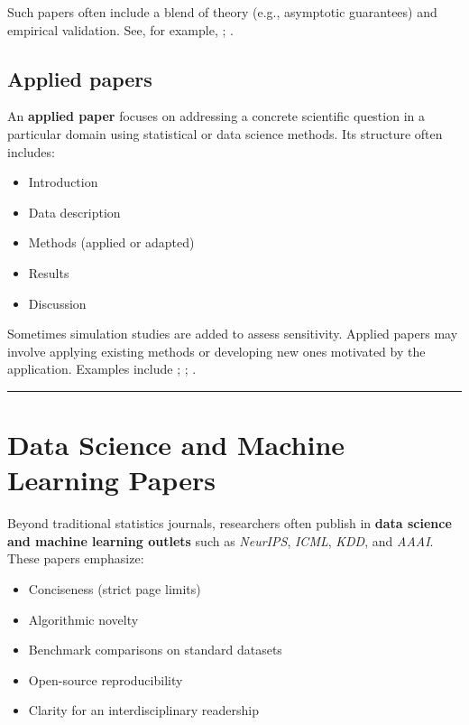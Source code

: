 \documentclass[
]{book}
\providecommand{\tightlist}{%
  \setlength{\itemsep}{0pt}\setlength{\parskip}{0pt}}
\theoremstyle{definition}
\theoremstyle{definition}
\theoremstyle{definition}
\theoremstyle{definition}
\theoremstyle{remark}
\begin{document}
Such papers often include a blend of theory (e.g., asymptotic guarantees) and empirical validation. See, for example, \citet{li2023regularized}; \citet{lau2022bias}.

\subsection{Applied papers}\label{applied-papers}

An \textbf{applied paper} focuses on addressing a concrete scientific question in a particular domain using statistical or data science methods. Its structure often includes:

\begin{itemize}
\tightlist
\item
  Introduction\\
\item
  Data description\\
\item
  Methods (applied or adapted)\\
\item
  Results\\
\item
  Discussion
\end{itemize}

Sometimes simulation studies are added to assess sensitivity. Applied papers may involve applying existing methods or developing new ones motivated by the application. Examples include \citet{price2022effects}; \citet{caplan2019dental}; \citet{jiao2022cyberattack}.

\begin{center}\rule{0.5\linewidth}{0.5pt}\end{center}

\section{Data Science and Machine Learning Papers}\label{data-science-and-machine-learning-papers}

Beyond traditional statistics journals, researchers often publish in \textbf{data science and machine learning outlets} such as \emph{NeurIPS}, \emph{ICML}, \emph{KDD}, and \emph{AAAI}. These papers emphasize:

\begin{itemize}
\tightlist
\item
  Conciseness (strict page limits)\\
\item
  Algorithmic novelty\\
\item
  Benchmark comparisons on standard datasets\\
\item
  Open-source reproducibility\\
\item
  Clarity for an interdisciplinary readership
\end{itemize}
\end{document}
